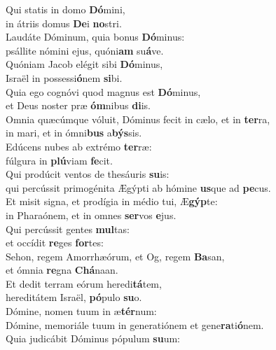 \evenverse Qui statis in domo \textbf{Dó}mini,~\*\\
\evenverse in átriis domus \textbf{De}i \textbf{no}stri.\\
\oddverse Laudáte Dóminum, quia bonus \textbf{Dó}minus:~\*\\
\oddverse psállite nómini ejus, quóni\textbf{am} su\textbf{á}ve.\\
\evenverse Quóniam Jacob elégit sibi \textbf{Dó}minus,~\*\\
\evenverse Israël in possessi\textbf{ó}nem \textbf{si}bi.\\
\oddverse Quia ego cognóvi quod magnus est \textbf{Dó}minus,~\*\\
\oddverse et Deus noster præ \textbf{óm}nibus \textbf{di}is.\\
\evenverse Omnia quæcúmque vóluit, Dóminus fecit in cælo, et in \textbf{ter}ra,~\*\\
\evenverse in mari, et in ómni\textbf{bus} a\textbf{býs}sis.\\
\oddverse Edúcens nubes ab extrémo \textbf{ter}ræ:~\*\\
\oddverse fúlgura in \textbf{plú}viam \textbf{fe}cit.\\
\evenverse Qui prodúcit ventos de thesáuris \textbf{su}is:~\*\\
\evenverse qui percússit primogénita Ægýpti ab hómine \textbf{us}que ad \textbf{pe}cus.\\
\oddverse Et misit signa, et prodígia in médio tui, Æ\textbf{gýp}te:~\*\\
\oddverse in Pharaónem, et in omnes \textbf{ser}vos \textbf{e}jus.\\
\evenverse Qui percússit gentes \textbf{mul}tas:~\*\\
\evenverse et occídit \textbf{re}ges \textbf{for}tes:\\
\oddverse Sehon, regem Amorrhæórum, et Og, regem \textbf{Ba}san,~\*\\
\oddverse et ómnia \textbf{re}gna \textbf{Chá}naan.\\
\evenverse Et dedit terram eórum heredi\textbf{tá}tem,~\*\\
\evenverse hereditátem Israël, \textbf{pó}pulo \textbf{su}o.\\
\oddverse Dómine, nomen tuum in æ\textbf{tér}num:~\*\\
\oddverse Dómine, memoriále tuum in generatiónem et gene\textbf{ra}ti\textbf{ó}nem.\\
\evenverse Quia judicábit Dóminus pópulum \textbf{su}um:~\*\\

